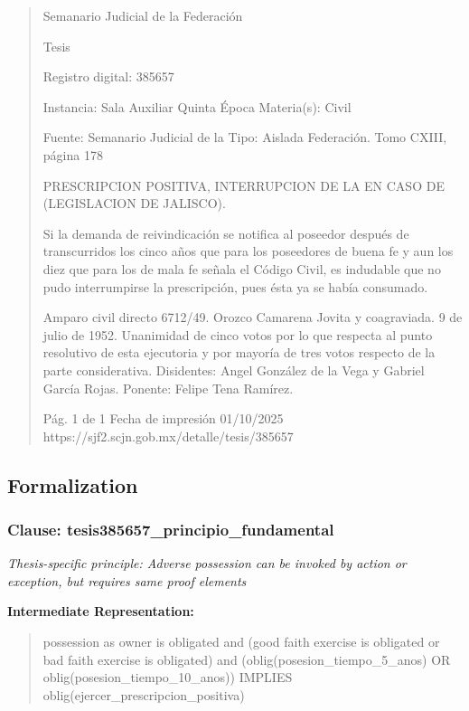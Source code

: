 \documentclass[11pt,a4paper]{article}
\begin{document}
\begin{quote}
                                                   Semanario Judicial de la Federación

                                                  Tesis

 Registro digital: 385657

 Instancia: Sala Auxiliar         Quinta Época                         Materia(s): Civil

                                  Fuente: Semanario Judicial de la     Tipo: Aislada
                                  Federación.
                                  Tomo CXIII, página 178


PRESCRIPCION POSITIVA, INTERRUPCION DE LA EN CASO DE (LEGISLACION DE JALISCO).


Si la demanda de reivindicación se notifica al poseedor después de transcurridos los cinco años que
para los poseedores de buena fe y aun los diez que para los de mala fe señala el Código Civil, es
indudable que no pudo interrumpirse la prescripción, pues ésta ya se había consumado.


Amparo civil directo 6712/49. Orozco Camarena Jovita y coagraviada. 9 de julio de 1952.
Unanimidad de cinco votos por lo que respecta al punto resolutivo de esta ejecutoria y por mayoría
de tres votos respecto de la parte considerativa. Disidentes: Angel González de la Vega y Gabriel
García Rojas. Ponente: Felipe Tena Ramírez.




                                             Pág. 1 de 1             Fecha de impresión 01/10/2025
  https://sjf2.scjn.gob.mx/detalle/tesis/385657

\end{quote}

\subsection{Formalization}

\subsubsection{Clause: tesis385657\_principio\_fundamental}

\textit{Thesis-specific principle: Adverse possession can be invoked by action or exception, but requires same proof elements}

\textbf{Intermediate Representation:}

\begin{quote}
possession as owner is obligated and (good faith exercise is obligated or bad faith exercise is obligated) and (oblig(posesion\_tiempo\_5\_anos) OR oblig(posesion\_tiempo\_10\_anos)) IMPLIES oblig(ejercer\_prescripcion\_positiva)
\end{quote}
\end{document}

